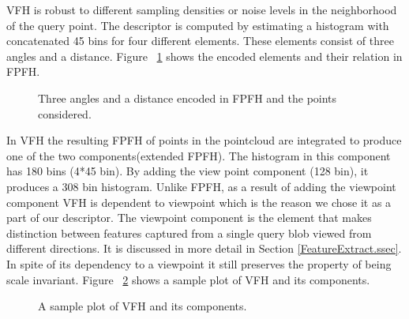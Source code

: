VFH is robust to different sampling densities or noise levels in the neighborhood of the query point. 
The descriptor is computed by estimating a histogram with concatenated 45 bins for four different elements.
These elements consist of three angles and a distance. 
Figure  ~\ref{FPFH.figure} shows the encoded elements and their relation in FPFH.

\begin{figure}[t]
  \caption[FPFH elements.]
  {Three angles and a distance encoded in FPFH and the points considered.\cite{VFH_Definition}}
  \label{FPFH.figure}
\end{figure}

In VFH the resulting FPFH of points in the pointcloud are integrated to produce one of the two 
components(extended FPFH).
The histogram in this component has 180 bins (4*45 bin).
By adding the view point component (128 bin), it produces a 308 bin histogram. 
Unlike FPFH, as a result of adding the viewpoint component VFH is dependent to viewpoint which is the reason we chose
it as a part of our descriptor.
The viewpoint component is the element that makes distinction between features captured from a single query blob viewed 
from different directions.
It is discussed in more detail in Section \ref{FeatureExtract.ssec}.
In spite of its dependency to a viewpoint it still preserves the property of being scale invariant. 
Figure ~\ref{VFH_plot.figure} shows a sample plot of VFH and its components.

\begin{figure}[t]
  \caption[VFH histogram]
  {A sample plot of VFH and its components.\cite{VFH_Definition}}
  \label{VFH_plot.figure}
\end{figure}

